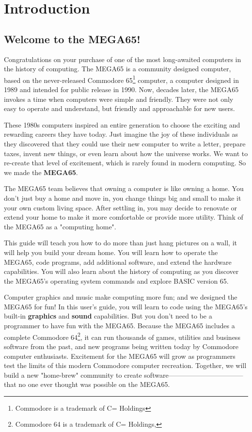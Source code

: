 \chapter{Introduction}

\section{Welcome to the MEGA65!}

Congratulations on your purchase of one of the most long-awaited computers in the history of computing. The MEGA65 is a community designed computer, based on the never-released Commodore{\textregistered} 65\footnote{Commodore is a trademark of C= Holdings} computer, a computer designed in 1989 and intended for public release in 1990. Now, decades later, the MEGA65 invokes a time when computers were simple and friendly. They were not only easy to operate and understand, but friendly and approachable for new users.

These 1980s computers inspired an entire generation to choose the exciting and rewarding careers they have today. Just imagine the joy of these individuals as they discovered that they could use their new computer to write a letter, prepare taxes, invent new things, or even learn about how the universe works. We want to re-create that level of excitement, which is rarely found in modern computing. So we made the {\bf MEGA65}.

The MEGA65 team believes that owning a computer is like owning a home. You don't just buy a home and move in, you change things big and small to make it your own custom living space. After settling in, you may decide to renovate or extend your home to make it more comfortable or provide more utility. Think of the MEGA65 as a "computing home".

This guide will teach you how to do more than just hang pictures on a wall, it will help you build your dream home. You will learn how to operate the MEGA65, code programs, add additional software, and extend the hardware capabilities. You will also learn about the history of computing as you discover the MEGA65's operating system commands and explore BASIC version 65.

Computer graphics and music make computing more fun; and we designed the MEGA65 for fun! In this user's guide, you
will learn to code using the MEGA65's built-in {\bf graphics} and {\bf sound} capabilities. But you don't need to be
a programmer to have fun with the MEGA65. Because the MEGA65 includes a complete Commodore{\textregistered}
64{\texttrademark}\footnote{Commodore 64 is a trademark of C= Holdings,}, it can run thousands of games, utilities
and business software from the past, and new programs being written today by Commodore computer enthusiasts.
Excitement for the MEGA65 will grow as programmers test the limits of this modern Commodore computer recreation.
Together, we will build a new "home-brew" community to create software--------------------------------- that no one
ever thought was possible on
the MEGA65.

